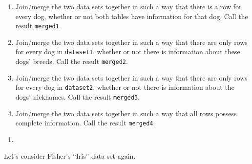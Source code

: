 \documentclass[
  12pt,
  krantz2]{krantz}
\providecommand{\tightlist}{%
  \setlength{\itemsep}{0pt}\setlength{\parskip}{0pt}}
\begin{document}
\begin{enumerate}
\def\labelenumi{\alph{enumi})}
\tightlist
\item
  Join/merge the two data sets together in such a way that there is a row for every dog, whether or not both tables have information for that dog. Call the result \texttt{merged1}.
\item
  Join/merge the two data sets together in such a way that there are only rows for every dog in \texttt{dataset1}, whether or not there is information about these dogs' breeds. Call the result \texttt{merged2}.
\item
  Join/merge the two data sets together in such a way that there are only rows for every dog in \texttt{dataset2}, whether or not there is information about the dogs' nicknames. Call the result \texttt{merged3}.
\item
  Join/merge the two data sets together in such a way that all rows possess complete information. Call the result \texttt{merged4}.
\end{enumerate}

\begin{enumerate}
\def\labelenumi{\arabic{enumi}.}
\setcounter{enumi}{3}
\tightlist
\item
\end{enumerate}

Let's consider Fisher's ``Iris'' data set \citep{misc_iris_53} again.
\end{document}
